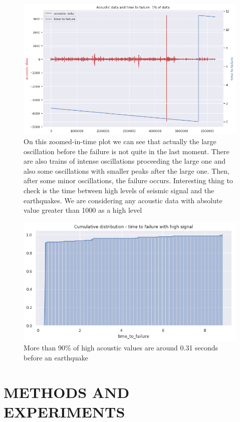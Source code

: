\documentclass[]{llncs}
\begin{document}
\begin{figure}
	\centering
	\includegraphics[width=0.7\linewidth]{../GPUProject/zoomedInTimePlot}
	\caption{On this zoomed-in-time plot we can see that actually the large oscillation before the failure is not quite in the last moment. There are also trains of intense oscillations proceeding the large one and also some oscillations with smaller peaks after the large one. Then, after some minor oscillations, the failure occurs. Interesting thing to check is the time between high levels of seismic signal and the earthquakes. We are considering any acoustic data with absolute value greater than 1000 as a high level}
	\label{fig:zoomedintimeplot}
\end{figure}

\begin{figure}
	\centering
	\includegraphics[width=0.7\linewidth]{../GPUProject/moreThan90percent}
	\caption{More than 90\% of high acoustic values are around 0.31 seconds before an earthquake}
		\label{fig:morethan90percent}
	\end{figure}






\section{METHODS AND EXPERIMENTS}
\end{document}
